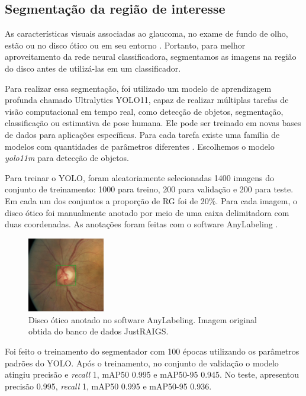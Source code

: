 \documentclass[12pt]{article}
\begin{document}
\subsection{Segmentação da região de interesse}
\label{sec:segmentation}

As características visuais associadas ao glaucoma, no exame de fundo de olho, estão ou no disco ótico ou em seu entorno \cite{weinreb_2016}. Portanto, para melhor aproveitamento da rede neural classificadora, segmentamos as imagens na região do disco antes de utilizá-las em um classificador.

Para realizar essa segmentação, foi utilizado um modelo de aprendizagem profunda chamado Ultralytics YOLO11, capaz de realizar múltiplas tarefas de visão computacional em tempo real, como detecção de objetos, segmentação, classificação ou estimativa de pose humana. Ele pode ser treinado em novas bases de dados para aplicações específicas. Para cada tarefa existe uma família de modelos com quantidades de parâmetros diferentes \cite{YOLO_2023}. Escolhemos o modelo \emph{yolo11m} para detecção de objetos.

Para treinar o YOLO, foram aleatoriamente selecionadas 1400 imagens do conjunto de treinamento: 1000 para treino, 200 para validação e 200 para teste. Em cada um dos conjuntos a proporção de RG foi de 20\%. Para cada imagem, o disco ótico foi manualmente anotado por meio de uma caixa delimitadora com duas coordenadas. As anotações foram feitas com o software AnyLabeling \cite{anylabeling}.

\begin{figure}[htb]
 \centering
 \includegraphics[width=0.3\textwidth]{images/disk_labeling.png}
 \caption{Disco ótico anotado no software AnyLabeling. Imagem original obtida do banco de dados JustRAIGS.}
 \label{fig:disk_labeling}
\end{figure}

Foi feito o treinamento do segmentador com 100 épocas utilizando os parâmetros padrões do YOLO. Após o treinamento, no conjunto de validação o modelo atingiu precisão e \emph{recall} 1, mAP50 0.995 e mAP50-95 0.945. No teste, apresentou precisão 0.995, \emph{recall} 1, mAP50 0.995 e mAP50-95 0.936.
\end{document}
